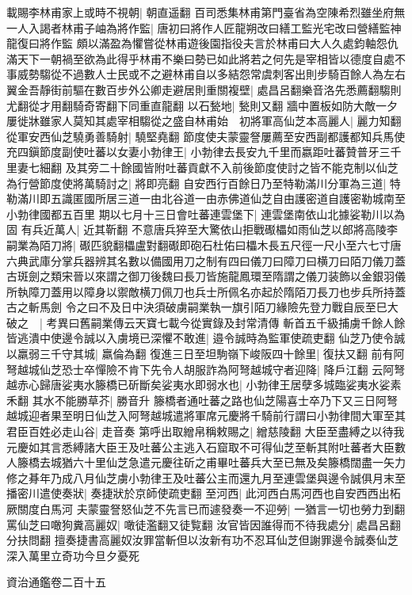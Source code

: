 載賜李林甫家上或時不視朝|{
	朝直遥翻}
百司悉集林甫第門臺省為空陳希烈雖坐府無一人入謁者林甫子岫為將作監|{
	唐初曰將作人匠龍朔改曰繕工監光宅改曰營繕監神龍復曰將作監}
頗以滿盈為懼嘗從林甫遊後園指役夫言於林甫曰大人久處鈞軸怨仇滿天下一朝禍至欲為此得乎林甫不樂曰勢已如此將若之何先是宰相皆以德度自處不事威勢騶從不過數人士民或不之避林甫自以多結怨常虞刺客出則步騎百餘人為左右翼金吾靜街前驅在數百步外公卿走避居則重關複壁|{
	處昌呂翻樂音洛先悉薦翻騶則尤翻從才用翻騎奇寄翻下同重直龍翻}
以石甃地|{
	甃則又翻}
牆中置板如防大敵一夕屢徙牀雖家人莫知其處宰相騶從之盛自林甫始　初將軍高仙芝本高麗人|{
	麗力知翻}
從軍安西仙芝驍勇善騎射|{
	驍堅堯翻}
節度使夫蒙靈詧屢薦至安西副都護都知兵馬使充四鎭節度副使吐蕃以女妻小勃律王|{
	小勃律去長安九千里而嬴距吐蕃贊普牙三千里妻七細翻}
及其旁二十餘國皆附吐蕃貢獻不入前後節度使討之皆不能克制以仙芝為行營節度使將萬騎討之|{
	將即亮翻}
自安西行百餘日乃至特勒滿川分軍為三道|{
	特勒滿川即五識匿國所居三道一由北谷道一由赤佛道仙芝自由護密道自護密勒城南至小勃律國都五百里}
期以七月十三日會吐蕃連雲堡下|{
	連雲堡南依山北據娑勒川以為固}
有兵近萬人|{
	近其靳翻}
不意唐兵猝至大驚依山拒戰礟櫑如雨仙芝以郎將高陵李嗣業為陌刀將|{
	礟匹貌翻櫑盧對翻礟即砲石杜佑曰櫑木長五尺徑一尺小至六七寸唐六典武庫分掌兵器辨其名數以備國用刀之制有四曰儀刀曰障刀曰横刀曰陌刀儀刀蓋古斑劍之類宋晉以來謂之御刀後魏曰長刀皆施龍鳳環至隋謂之儀刀装飾以金銀羽儀所執障刀蓋用以障身以禦敵横刀佩刀也兵士所佩名亦起於隋陌刀長刀也步兵所持蓋古之斬馬劍}
令之曰不及日中決須破虜嗣業執一旗引陌刀緣險先登力戰自辰至巳大破之　|{
	考異曰舊嗣業傳云天寶七載今從實錄及封常清傳}
斬首五千級捕虜千餘人餘皆逃潰中使邊令誠以入虜境已深懼不敢進|{
	邉令誠時為監軍使疏吏翻}
仙芝乃使令誠以羸弱三千守其城|{
	羸倫為翻}
復進三日至坦駒嶺下峻阪四十餘里|{
	復扶又翻}
前有阿弩越城仙芝恐士卒憚險不肯下先令人胡服詐為阿弩越城守者迎降|{
	降戶江翻}
云阿弩越赤心歸唐娑夷水籐橋已斫斷矣娑夷水即弱水也|{
	小勃律王居孽多城臨娑夷水娑素禾翻}
其水不能勝草芥|{
	勝音升}
籐橋者通吐蕃之路也仙芝陽喜士卒乃下又三日阿弩越城迎者果至明日仙芝入阿弩越城遣將軍席元慶將千騎前行謂曰小勃律間大軍至其君臣百姓必走山谷|{
	走音奏}
第呼出取繒帛稱敕賜之|{
	繒慈陵翻}
大臣至盡縛之以待我元慶如其言悉縛諸大臣王及吐蕃公主逃入石窟取不可得仙芝至斬其附吐蕃者大臣數人籐橋去城猶六十里仙芝急遣元慶往斫之甫畢吐蕃兵大至已無及矣籐橋闊盡一矢力修之朞年乃成八月仙芝虜小勃律王及吐蕃公主而還九月至連雲堡與邊令誠俱月末至播密川遣使奏狀|{
	奏捷狀於京師使疏吏翻}
至河西|{
	此河西白馬河西也自安西西出柘厥關度白馬河}
夫蒙靈詧怒仙芝不先言已而遽發奏一不迎勞|{
	一猶言一切也勞力到翻}
罵仙芝曰噉狗糞高麗奴|{
	噉徒濫翻又徒覧翻}
汝官皆因誰得而不待我處分|{
	處昌呂翻分扶問翻}
擅奏捷書高麗奴汝罪當斬但以汝新有功不忍耳仙芝但謝罪邊令誠奏仙芝深入萬里立奇功今旦夕憂死

資治通鑑卷二百十五
